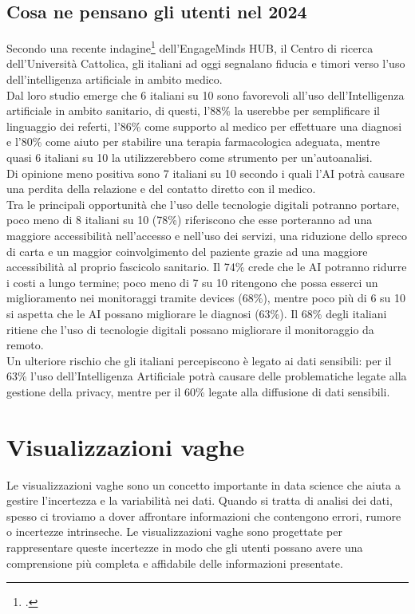 \subsection{Cosa ne pensano gli utenti nel 2024}
Secondo una recente indagine\footcite{womak:intelligenza-artificiale-e-medicina} dell'EngageMinds HUB, il Centro di ricerca dell'Università Cattolica, gli italiani ad oggi segnalano fiducia e timori verso l'uso dell'intelligenza artificiale in ambito medico.\\
Dal loro studio emerge che 6 italiani su 10 sono favorevoli all'uso dell'Intelligenza artificiale in ambito sanitario, di questi, l'88\% la userebbe per semplificare il linguaggio dei referti, l'86\% come supporto al medico per effettuare una diagnosi e l'80\% come aiuto per stabilire una terapia farmacologica adeguata, mentre quasi 6 italiani su 10 la utilizzerebbero come strumento per un'autoanalisi.\\
Di opinione meno positiva sono 7 italiani su 10 secondo i quali l'AI potrà causare una perdita della relazione e del contatto diretto con il medico.\\

Tra le principali opportunità che l'uso delle tecnologie digitali potranno portare, poco meno di 8 italiani su 10 (78\%) riferiscono che esse porteranno ad una maggiore accessibilità nell'accesso e nell'uso dei servizi, una riduzione dello spreco di carta e un maggior coinvolgimento del paziente grazie ad una maggiore accessibilità al proprio fascicolo sanitario. Il 74\% crede che le AI potranno ridurre i costi a lungo termine; poco meno di 7 su 10 ritengono che possa esserci un miglioramento nei monitoraggi tramite devices (68\%), mentre poco più di 6 su 10 si aspetta che le AI possano migliorare le diagnosi (63\%). Il 68\% degli italiani ritiene che l'uso di tecnologie digitali possano migliorare il monitoraggio da
remoto.\\

Un ulteriore rischio che gli italiani percepiscono è legato ai dati sensibili: per il 63\% l'uso dell'Intelligenza Artificiale potrà causare delle problematiche legate alla gestione della privacy, mentre per il 60\% legate alla diffusione di dati sensibili.


\section{Visualizzazioni vaghe}
Le visualizzazioni vaghe sono un concetto importante in data science che aiuta a gestire l'incertezza e la variabilità nei dati. Quando si tratta di analisi dei dati, spesso ci troviamo a dover affrontare informazioni che contengono errori, rumore o incertezze intrinseche. Le visualizzazioni vaghe sono progettate per rappresentare queste incertezze in modo che gli utenti possano avere una comprensione più completa e affidabile delle informazioni presentate.\\

